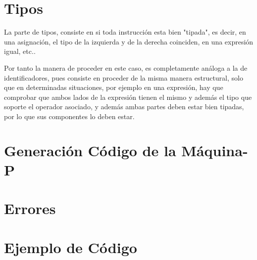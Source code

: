 \documentclass[a4paper, 11pt, twoside, openany, onecolumn, final]{memoir}
\begin{document}
	 \section{Tipos}
	 La parte de tipos, consiste en si toda instrucción esta bien "tipada", es decir, en una asignación, el tipo de la izquierda y de la derecha coinciden, en una expresión igual, etc..
	 
	 Por tanto la manera de proceder en este caso, es completamente análoga a la de identificadores, pues consiste en proceder de la misma manera estructural, solo que en determinadas situaciones, por ejemplo en una expresión, hay que comprobar que ambos lados de la expresión tienen el mismo y además el tipo que soporte el operador asociado, y además ambas partes deben estar bien tipadas, por lo que sus componentes lo deben estar. 
	 \section{Generación Código de la Máquina-P}
	 \section{Errores}
	 \section{Ejemplo de Código}
	 
\end{document}
